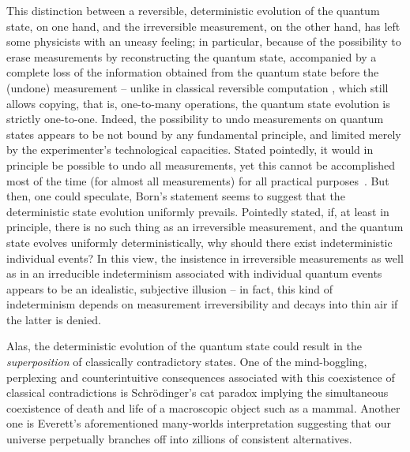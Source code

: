\documentclass[%
 reprint,
 showpacs,
 showkeys,
 preprintnumbers,
 amsmath,amssymb,
 aps,
 prl,
  longbibliography,
 ]{revtex4-1}
\begin{document}
This distinction between a reversible, deterministic evolution of the quantum state, on one hand,
and the irreversible measurement, on the other hand, has left some physicists with an uneasy feeling;
in particular, because of the possibility to erase
\citep{PhysRevD.22.879,PhysRevA.25.2208,greenberger2,Nature351,Zajonc-91,PhysRevA.45.7729,PhysRevLett.73.1223,PhysRevLett.75.3783,hkwz}
measurements by reconstructing the quantum state,
accompanied by a complete loss of the information obtained from the quantum state before the (undone) measurement --
unlike in classical reversible computation \citep{bennett-73,bennett-82,maxwell-demon},
which still allows copying, that is, one-to-many operations, the quantum state evolution is strictly one-to-one.
Indeed, the possibility to undo measurements on quantum states appears to be  not bound by any fundamental principle,
and limited merely by the experimenter's  technological capacities.
Stated pointedly, it would in principle be possible to undo all measurements,
yet this cannot be accomplished  most of the time (for almost all measurements)
for all practical purposes~\cite{bell:a1}.
But then, one could speculate, Born's statement seems to suggest that the deterministic state evolution uniformly prevails.
Pointedly stated, if, at least in principle, there is no such thing as an irreversible measurement,
and the quantum state evolves uniformly deterministically, why should there exist indeterministic individual events?
In this view, the insistence in irreversible measurements as well as in an irreducible indeterminism associated with individual quantum events
appears to be an idealistic, subjective illusion -- in fact, this kind of indeterminism depends
on measurement irreversibility and decays into thin air if the latter is denied.

Alas, the deterministic evolution of the quantum state could result in the
{\em superposition} of classically contradictory states.
One of the mind-boggling, perplexing and counterintuitive consequences associated with this coexistence of classical contradictions is
Schr\"odinger's \citeyearpar[812]{schrodinger} cat paradox
implying the simultaneous coexistence of death and life of a macroscopic object such as a mammal.
Another one is Everett's \citeyearpar{everett} aforementioned many-worlds interpretation suggesting that
our universe perpetually branches
off into zillions of consistent alternatives.
\end{document}
